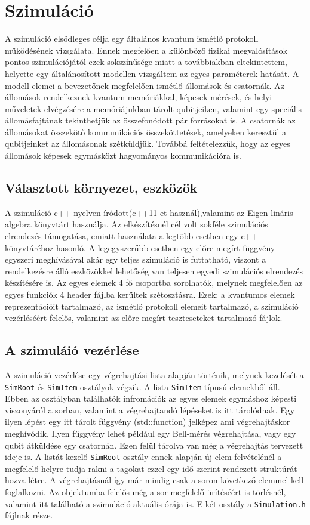 \chapter{Szimuláció}

A szimuláció elsődleges célja egy általános kvantum ismétlő protokoll működésének vizsgálata. Ennek megfelően a különböző fizikai megvalósítások pontos szimulációjától ezek sokszínűsége miatt a továbbiakban eltekintettem, helyette egy általánosított modellen vizsgáltem az egyes paraméterek hatását. A modell elemei a bevezetőnek megfelelően ismétlő állomások és csatornák. Az állomások rendelkeznek kvantum memóriákkal, képesek mérések, és helyi műveletek elvégzésére a memóriájukban tárolt qubitjeiken, valamint egy speciális állomásfajtának tekinthetjük az összefonódott pár forrásokat is. A csatornák az állomásokat összekötő kommunikációs összeköttetések, amelyeken keresztül a qubitjeinket az állomásonak szétküldjük. Továbbá feltételezzük, hogy az egyes állomások képesek egymásközt hagyományos kommunikációra is. 

\section{Választott környezet, eszközök}

A szimuláció c++ nyelven íródott(c++11-et használ),valamint az Eigen \cite{eigen}  lináris algebra könyvtárt használja. Az elkészítésnél cél volt sokféle szimulációs elrendezés támogatása, emiatt használata a legtöbb esetben egy c++ könyvtáréhoz hasonló. A legegyszerűbb esetben egy előre megírt függvény egyszeri meghívásával akár egy teljes szimuláció is futtatható, viszont a rendelkezésre álló eszközökkel lehetőség van teljesen egyedi szimulációs elrendezés készítésére is. Az egyes elemek 4 fő csoportba sorolhatók, melynek megfelelően az egyes funkciók 4 header fájlba kerültek szétosztásra. Ezek: a kvantumos elemek reprezentációit tartalmazó, az ismétlő protokoll elemeit tartalmazó, a szimuláció vezérléséért felelős, valamint az előre megírt teszteseteket  tartalmazó fájlok.
\section{A szimuláió vezérlése}
A szimuláció vezérlése egy végrehajtási lista alapján történik, melynek kezelését a \texttt{SimRoot} és \texttt{SimItem} osztályok végzik. A lista \texttt{SimItem} típusú elemekből áll. Ebben az osztályban találhatók infromációk az egyes elemek egymáshoz képesti viszonyáról a sorban, valamint a végrehajtandó lépéseket is itt tárolódnak. Egy ilyen lépést egy itt tárolt függvény (std::function) jelképez ami végrehajtáskor meghívódik. Ilyen függvény lehet például egy Bell-mérés végrehajtása, vagy egy qubit átküldése egy csatornán. Ezen felül tárolva van még a végrehajtás tervezett ideje is. A listát kezelő \texttt{SimRoot} osztály ennek alapján új elem felvételénél a megfelelő helyre tudja rakni a tagokat ezzel egy idő szerint rendezett struktúrát hozva létre. A végrehajtásnál így már mindig csak a soron következő  elemmel kell foglalkozni.  Az objektumba felelős még a sor megfelelő ürítéséért is törlésnél, valamint itt található a szimuláció aktuális órája is.
E két osztály a \texttt{Simulation.h} fájlnak része.

